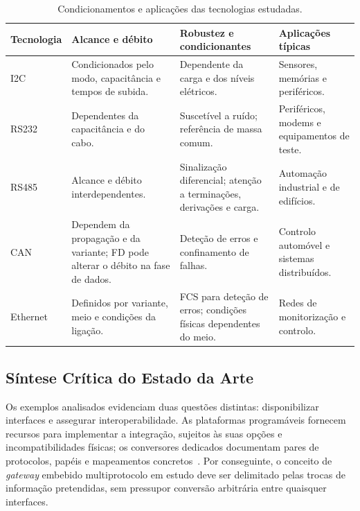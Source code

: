 \begin{table}[htbp]
    \centering
    \small
    \setlength{\tabcolsep}{4pt}
    \renewcommand{\arraystretch}{1.12}
    \caption{Condicionamentos e aplicações das tecnologias estudadas.}
    \label{tab:comparacao-condicoes}
    \begin{tabularx}{\textwidth}{@{}>{\raggedright\arraybackslash}p{}*{3}{>{\raggedright\arraybackslash}X}@{}}
        \toprule
        Tecnologia & Alcance e débito & Robustez e condicionantes & Aplicações típicas \\
        \midrule
        I2C~\cite{nxp_um10204_2021}
        & Condicionados pelo modo, capacitância e tempos de subida.
        & Dependente da carga e dos níveis elétricos.
        & Sensores, memórias e periféricos. \\
        \addlinespace
        RS232~\cite{ti_rs232_2002,dodson_rs232_2023}
        & Dependentes da capacitância e do cabo.
        & Suscetível a ruído; referência de massa comum.
        & Periféricos, modems e equipamentos de teste. \\
        \addlinespace
        RS485~\cite{ti_rs485_an1057_2013,stiller_rs485_2015}
        & Alcance e débito interdependentes.
        & Sinalização diferencial; atenção a terminações, derivações
        e carga.
        & Automação industrial e de edifícios. \\
        \addlinespace
        CAN~\cite{cia_can_hs,cia_can_cc,cia_can_fd}
        & Dependem da propagação e da variante; FD pode alterar
        o débito na fase de dados.
        & Deteção de erros e confinamento de falhas.
        & Controlo automóvel e sistemas distribuídos. \\
        \addlinespace
        Ethernet~\cite{ieee_8023_2018,simmons_ethernet_2008}
        & Definidos por variante, meio e condições da ligação.
        & FCS para deteção de erros; condições físicas dependentes do meio.
        & Redes de monitorização e controlo. \\
        \bottomrule
    \end{tabularx}
\end{table}

\subsection{Síntese Crítica do Estado da Arte}

Os exemplos analisados evidenciam duas questões distintas:
disponibilizar interfaces e assegurar interoperabilidade. As plataformas
programáveis fornecem recursos para implementar a integração, sujeitos
às suas opções e incompatibilidades físicas; os conversores dedicados
documentam pares de protocolos, papéis e mapeamentos
concretos~\cite{compulab_imx7_manual_2018,moxa_mgate5105,hms_ab7838}.
Por conseguinte, o conceito de \textit{gateway} embebido multiprotocolo
em estudo deve ser delimitado pelas trocas de informação pretendidas,
sem pressupor conversão arbitrária entre quaisquer interfaces.

